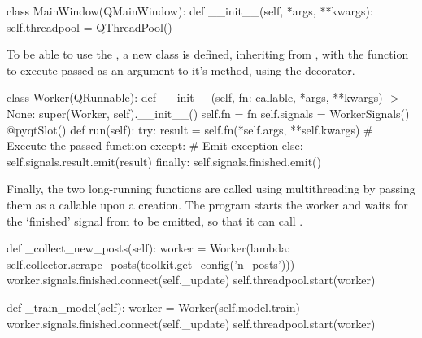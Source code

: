     \begin{python}
class MainWindow(QMainWindow):
    def __init__(self, *args, **kwargs):
        self.threadpool = QThreadPool()
    \end{python}

    To be able to use the , a new class  is defined, inheriting from , with the function to execute passed as an argument to it's  method, using the  decorator.

    \begin{python}
class Worker(QRunnable):
    def __init__(self, fn: callable, *args, **kwargs) -> None:
        super(Worker, self).__init__()
        self.fn = fn
        self.signals = WorkerSignals()
    @pyqtSlot()
    def run(self):
        try:
            result = self.fn(*self.args, **self.kwargs) # Execute the passed function
        except: # Emit exception
        else:
            self.signals.result.emit(result)
        finally:
            self.signals.finished.emit()
    \end{python}

    Finally, the two long-running functions are called using multithreading by passing them as a callable upon a  creation. The program starts the worker and waits for the `finished' signal from to be emitted, so that it can call .

    \begin{python}
def _collect_new_posts(self):
    worker = Worker(lambda: self.collector.scrape_posts(toolkit.get_config('n_posts')))
    worker.signals.finished.connect(self._update)
    self.threadpool.start(worker)

def _train_model(self):
    worker = Worker(self.model.train)
    worker.signals.finished.connect(self._update)
    self.threadpool.start(worker)
    \end{python}